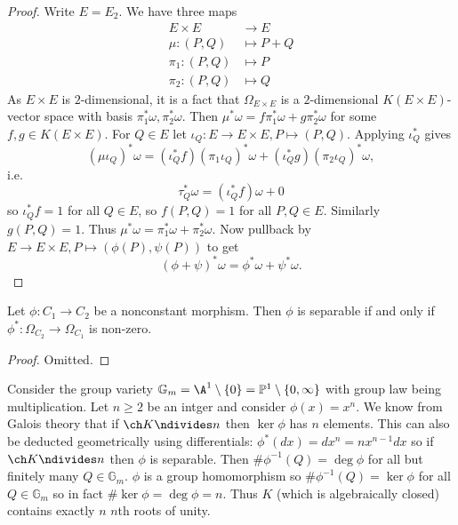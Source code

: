 \documentclass[a4paper]{article}
\theoremstyle{definition}
\theoremstyle{theorem}
\renewcommand*{\P}{\mathbb{P}}
\begin{document}
\begin{proof}
  Write \(E = E_2\). We have three maps
  \begin{align*}
    E \times E &\to E \\
    \mu: (P, Q) &\mapsto P + Q \\
    \pi_1: (P, Q) &\mapsto P \\
    \pi_2: (P, Q) &\mapsto Q
  \end{align*}
  As \(E \times E\) is \(2\)-dimensional, it is a fact that \(\Omega_{E \times E}\) is a \(2\)-dimensional \(K(E \times E)\)-vector space with basis \(\pi_1^* \omega, \pi_2^* \omega\). Then \(\mu^* \omega = f \pi_1^* \omega + g \pi_2^* \omega\) for some \(f, g \in K(E \times E)\). For \(Q \in E\) let \(\iota_Q: E \to E \times E, P \mapsto (P, Q)\). Applying \(\iota_Q^*\) gives
  \[
    (\mu \iota_Q)^* \omega = (\iota_Q^* f) (\pi_1 \iota_Q)^* \omega + (\iota_Q^* g) (\pi_2 \iota_Q)^* \omega,
  \]
  i.e.
  \[
    \tau_Q^* \omega = (\iota_Q^* f) \omega + 0
  \]
  so \(\iota_Q^*f = 1\) for all \(Q \in E\), so \(f(P, Q) = 1\) for all \(P, Q \in E\). Similarly \(g(P, Q) = 1\). Thus \(\mu^*\omega = \pi_1^* \omega + \pi_2^* \omega\). Now pullback by \(E \to E \times E, P \mapsto (\phi(P), \psi(P))\) to get
  \[
    (\phi + \psi)^*\omega = \phi^*\omega + \psi^*\omega.
  \]
\end{proof}

\begin{lemma}
  Let \(\phi: C_1 \to C_2\) be a nonconstant morphism. Then \(\phi\) is separable if and only if \(\phi^*: \Omega_{C_2} \to \Omega_{C_1}\) is non-zero.
\end{lemma}

\begin{proof}
  Omitted.
\end{proof}

\begin{eg}
  Consider the group variety \(\mathbb G_m = \A^1 \setminus \{0\} = \P^1 \setminus \{0, \infty\}\) with group law being multiplication. Let \(n \geq 2\) be an intger and consider \(\phi(x) = x^n\). We know from Galois theory that if \(\ch K \ndivides n\) then \(\ker \phi\) has \(n\) elements. This can also be deducted geometrically using differentials: \(\phi^* (dx) = dx^n = nx^{n - 1}dx\) so if \(\ch K \ndivides n\) then \(\phi\) is separable. Then \(\#\phi^{-1}(Q) = \deg \phi\) for all but finitely many \(Q \in \mathbb G_m\). \(\phi\) is a group homomorphism so \(\# \phi^{-1}(Q) = \ker \phi\) for all \(Q \in \mathbb G_m\) so in fact \(\# \ker \phi = \deg \phi= n\). Thus \(K\) (which is algebraically closed) contains exactly \(n\) \(n\)th roots of unity.
\end{eg}
\end{document}
